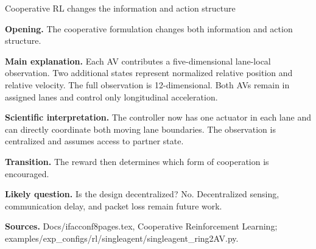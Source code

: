 \documentclass[aspectratio=169,11pt]{beamer}
\begin{document}
\begin{frame}[shrink=8]{Cooperative RL changes the information and action structure}
{    \textbf{Opening.} The cooperative formulation changes both information and action structure.

    \textbf{Main explanation.} Each AV contributes a five-dimensional lane-local observation. Two additional states represent normalized relative position and relative velocity. The full observation is 12-dimensional. Both AVs remain in assigned lanes and control only longitudinal acceleration.

    \textbf{Scientific interpretation.} The controller now has one actuator in each lane and can directly coordinate both moving lane boundaries. The observation is centralized and assumes access to partner state.

    \textbf{Transition.} The reward then determines which form of cooperation is encouraged.

    \textbf{Likely question.} Is the design decentralized? No. Decentralized sensing, communication delay, and packet loss remain future work.

    \textbf{Sources.} Docs/ifacconf8pages.tex, Cooperative Reinforcement Learning; examples/exp\_configs/rl/singleagent/singleagent\_ring2AV.py.
  }
\end{frame}
\end{document}
